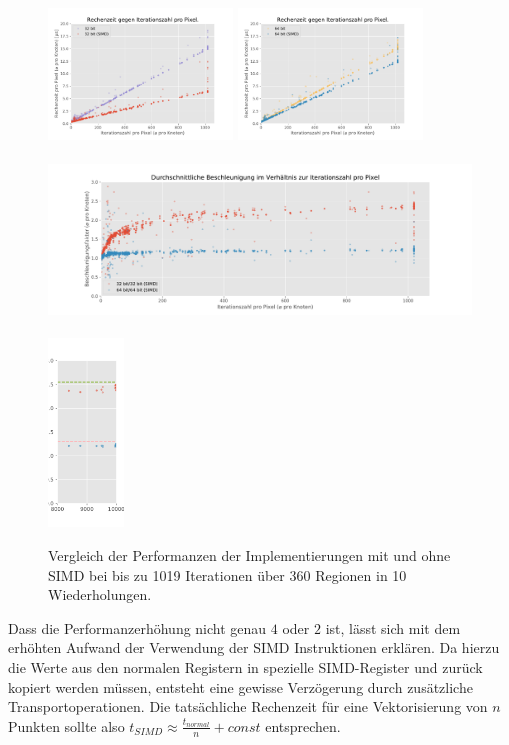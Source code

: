 \begin{figure}
	\centering
	\includegraphics[height=3.5cm]{img/Evaluation/simd/itvscmp32.pdf}
	\includegraphics[height=3.5cm]{img/Evaluation/simd/itvscmp64.pdf}
	\includegraphics[height=5cm]{img/Evaluation/simd/speedup.pdf}
	\includegraphics[height=5cm]{img/Evaluation/simd/speedup_10000_crop.pdf}
	\caption{Vergleich der Performanzen der Implementierungen mit und ohne SIMD bei bis zu 1019 Iterationen über 360 Regionen in 10 Wiederholungen.}
	\label{fig:SIMD-speedup}
	\label{fig:SIMD-speedup-vs-comptime}
\end{figure}

Dass die Performanzerhöhung nicht genau $4$ oder $2$ ist, lässt sich mit dem erhöhten Aufwand der Verwendung
der SIMD Instruktionen erklären.
Da hierzu die Werte aus den normalen Registern in spezielle SIMD-Register und zurück
kopiert werden müssen, entsteht eine gewisse Verzögerung durch zusätzliche Transportoperationen.
Die tatsächliche Rechenzeit für eine Vektorisierung von \(n\) Punkten sollte also \(t_{SIMD} \approx \frac{t_{normal}}{n}+ const\) entsprechen.


